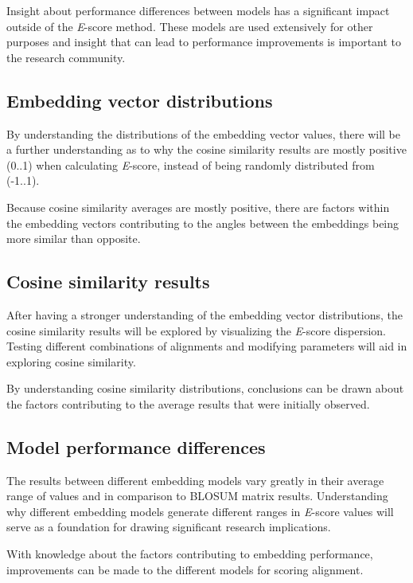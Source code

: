 \documentclass[
	letterpaper, %
	10pt, %
]{journalArticle}
\begin{document}
Insight about performance differences between models has a significant impact outside of the \textit{E}-score method. These models are used extensively for other purposes and insight that can lead to performance improvements is important to the research community.

\subsection{Embedding vector distributions}

By understanding the distributions of the embedding vector values, there will be a further understanding as to why the cosine similarity results are mostly positive (0..1) when calculating \textit{E}-score, instead of being randomly distributed from (-1..1).

Because cosine similarity averages are mostly positive, there are factors within the embedding vectors contributing to the angles between the embeddings being more similar than opposite.

\subsection{Cosine similarity results}

After having a stronger understanding of the embedding vector distributions, the cosine similarity results will be explored by visualizing the \textit{E}-score dispersion. Testing different combinations of alignments and modifying parameters will aid in exploring cosine similarity.

By understanding cosine similarity distributions, conclusions can be drawn about the factors contributing to the average results that were initially observed.

\subsection{Model performance differences}

The results between different embedding models vary greatly in their average range of values and in comparison to BLOSUM \autocite{Henikoff:1992} matrix results. Understanding why different embedding models generate different ranges in \textit{E}-score values will serve as a foundation for drawing significant research implications. 

With knowledge about the factors contributing to embedding performance, improvements can be made to the different models for scoring alignment.
\end{document}
